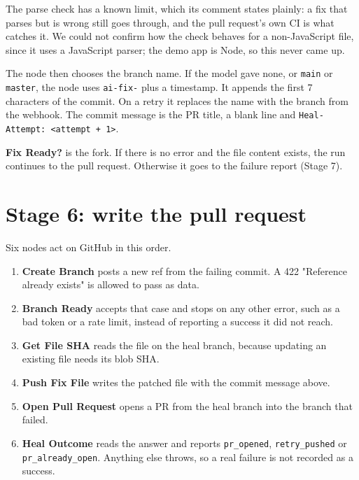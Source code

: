\documentclass[11pt,a4paper]{report}
\begin{document}
The parse check has a known limit, which its comment states plainly: a fix that parses but is wrong still goes through, and the pull request's own CI is what catches it. We could not confirm how the check behaves for a non-JavaScript file, since it uses a JavaScript parser; the demo app is Node, so this never came up.

The node then chooses the branch name. If the model gave none, or \texttt{main} or \texttt{master}, the node uses \texttt{ai-\allowbreak{}fix-\allowbreak{}} plus a timestamp. It appends the first 7 characters of the commit. On a retry it replaces the name with the branch from the webhook. The commit message is the PR title, a blank line and \texttt{Heal-\allowbreak{}Attempt: \textless{}attempt + 1\textgreater{}}.

\textbf{Fix Ready?} is the fork. If there is no error and the file content exists, the run continues to the pull request. Otherwise it goes to the failure report (Stage 7).

\section{Stage 6: write the pull request}

Six nodes act on GitHub in this order.

\begin{enumerate}[leftmargin=*,itemsep=2pt]
\item \textbf{Create Branch} posts a new ref from the failing commit. A 422 "Reference already exists" is allowed to pass as data.
\item \textbf{Branch Ready} accepts that case and stops on any other error, such as a bad token or a rate limit, instead of reporting a success it did not reach.
\item \textbf{Get File SHA} reads the file on the heal branch, because updating an existing file needs its blob SHA.
\item \textbf{Push Fix File} writes the patched file with the commit message above.
\item \textbf{Open Pull Request} opens a PR from the heal branch into the branch that failed.
\item \textbf{Heal Outcome} reads the answer and reports \texttt{pr\_\allowbreak{}opened}, \texttt{retry\_\allowbreak{}pushed} or \texttt{pr\_\allowbreak{}already\_\allowbreak{}open}. Anything else throws, so a real failure is not recorded as a success.
\end{enumerate}
\end{document}
